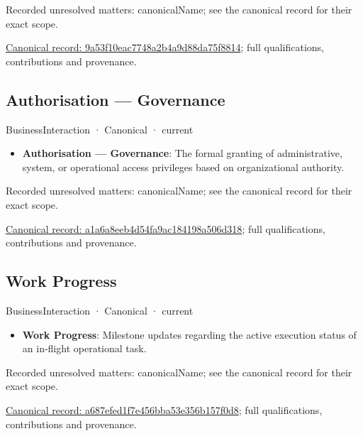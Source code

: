 {\small Recorded unresolved matters: canonicalName; see the canonical record for their exact scope.}\par
{\footnotesize \href{../../../../continuum/business/business-interaction/9a53f10eac7748a2b4a9d88da75f8814.md}{Canonical record: 9a53f10eac7748a2b4a9d88da75f8814}; full qualifications, contributions and provenance.}\par
\subsection{Authorisation — Governance}

\label{element:a1a6a8eeb4d54fa9ac184198a506d318}
{\small BusinessInteraction · Canonical · current}\par

\begin{itemize}


\item \textbf{Authorisation — Governance}: The formal granting of administrative, system, or operational access privileges based on organizational authority.

\end{itemize}

{\small Recorded unresolved matters: canonicalName; see the canonical record for their exact scope.}\par
{\footnotesize \href{../../../../continuum/business/business-interaction/a1a6a8eeb4d54fa9ac184198a506d318.md}{Canonical record: a1a6a8eeb4d54fa9ac184198a506d318}; full qualifications, contributions and provenance.}\par
\subsection{Work Progress}

\label{element:a687efed1f7e456bba53e356b157f0d8}
{\small BusinessInteraction · Canonical · current}\par

\begin{itemize}


\item \textbf{Work Progress}: Milestone updates regarding the active execution status of an in-flight operational task.

\end{itemize}

{\small Recorded unresolved matters: canonicalName; see the canonical record for their exact scope.}\par
{\footnotesize \href{../../../../continuum/business/business-interaction/a687efed1f7e456bba53e356b157f0d8.md}{Canonical record: a687efed1f7e456bba53e356b157f0d8}; full qualifications, contributions and provenance.}\par
